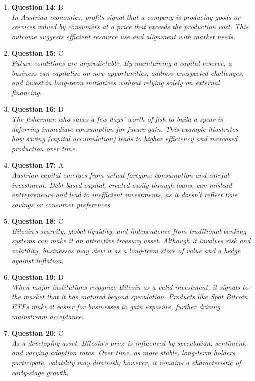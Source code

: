 \documentclass[12pt,a4paper]{article}
\begin{document}
\begin{enumerate}
\item \textbf{Question 14:} B
\\ \textit{In Austrian economics, profits signal that a company is producing goods or services valued by consumers at a price that exceeds the production cost. This outcome suggests efficient resource use and alignment with market needs.}

\item \textbf{Question 15:} C
\\ \textit{Future conditions are unpredictable. By maintaining a capital reserve, a business can capitalize on new opportunities, address unexpected challenges, and invest in long-term initiatives without relying solely on external financing.}

\item \textbf{Question 16:} D
\\ \textit{The fisherman who saves a few days’ worth of fish to build a spear is deferring immediate consumption for future gain. This example illustrates how saving (capital accumulation) leads to higher efficiency and increased production over time.}

\item \textbf{Question 17:} A
\\ \textit{Austrian capital emerges from actual foregone consumption and careful investment. Debt-based capital, created easily through loans, can mislead entrepreneurs and lead to inefficient investments, as it doesn’t reflect true savings or consumer preferences.}

\item \textbf{Question 18:} C
\\ \textit{Bitcoin’s scarcity, global liquidity, and independence from traditional banking systems can make it an attractive treasury asset. Although it involves risk and volatility, businesses may view it as a long-term store of value and a hedge against inflation.}

\item \textbf{Question 19:} D
\\ \textit{When major institutions recognize Bitcoin as a valid investment, it signals to the market that it has matured beyond speculation. Products like Spot Bitcoin ETFs make it easier for businesses to gain exposure, further driving mainstream acceptance.}

\item \textbf{Question 20:} C
\\ \textit{As a developing asset, Bitcoin’s price is influenced by speculation, sentiment, and varying adoption rates. Over time, as more stable, long-term holders participate, volatility may diminish; however, it remains a characteristic of early-stage growth.}


\end{enumerate}
\end{document}

